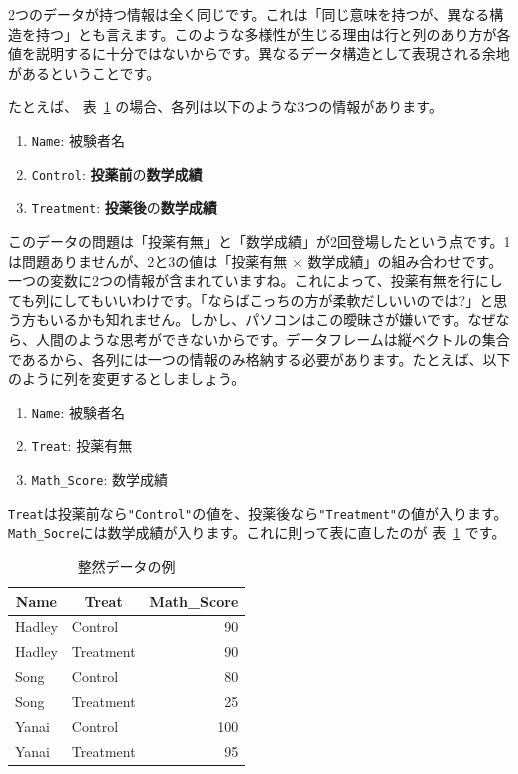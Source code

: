 \documentclass[
  a4paper,
  pandoc,
  ja=standard,
  jafont=haranoaji]{bxjsbook}
\providecommand{\tightlist}{%
  \setlength{\itemsep}{0pt}\setlength{\parskip}{0pt}}
\begin{document}
2つのデータが持つ情報は全く同じです。これは「同じ意味を持つが、異なる構造を持つ」とも言えます。このような多様性が生じる理由は行と列のあり方が各値を説明するに十分ではないからです。異なるデータ構造として表現される余地があるということです。

たとえば、 表~\ref{tbl-tidydata_tidydata}
の場合、各列は以下のような3つの情報があります。

\begin{enumerate}
\def\labelenumi{\arabic{enumi}.}
\tightlist
\item
  \texttt{Name}: 被験者名
\item
  \texttt{Control}: \textbf{投薬前}の\textbf{数学成績}
\item
  \texttt{Treatment}: \textbf{投薬後}の\textbf{数学成績}
\end{enumerate}

このデータの問題は「投薬有無」と「数学成績」が2回登場したという点です。1は問題ありませんが、2と3の値は「投薬有無
\(\times\)
数学成績」の組み合わせです。一つの変数に2つの情報が含まれていますね。これによって、投薬有無を行にしても列にしてもいいわけです。「ならばこっちの方が柔軟だしいいのでは?」と思う方もいるかも知れません。しかし、パソコンはこの曖昧さが嫌いです。なぜなら、人間のような思考ができないからです。データフレームは縦ベクトルの集合であるから、各列には一つの情報のみ格納する必要があります。たとえば、以下のように列を変更するとしましょう。

\begin{enumerate}
\def\labelenumi{\arabic{enumi}.}
\tightlist
\item
  \texttt{Name}: 被験者名
\item
  \texttt{Treat}: 投薬有無
\item
  \texttt{Math\_Score}: 数学成績
\end{enumerate}

\texttt{Treat}は投薬前なら\texttt{"Control"}の値を、投薬後なら\texttt{"Treatment"}の値が入ります。\texttt{Math\_Socre}には数学成績が入ります。これに則って表に直したのが
表~\ref{tbl-tidydata_tidydata} です。

\hypertarget{tbl-tidydata_tidydata}{}
\begin{table}
\caption{\label{tbl-tidydata_tidydata}整然データの例 }

\centering
\begin{tabular}{l|l|r}
\hline
\multicolumn{1}{c}{Name} & \multicolumn{1}{c}{Treat} & \multicolumn{1}{c}{Math\_Score}\\
\hline
Hadley & Control & 90\\
\hline
Hadley & Treatment & 90\\
\hline
Song & Control & 80\\
\hline
Song & Treatment & 25\\
\hline
Yanai & Control & 100\\
\hline
Yanai & Treatment & 95\\
\hline
\end{tabular}
\end{table}
\end{document}
